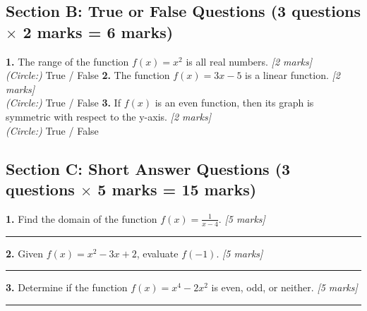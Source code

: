\documentclass[12pt,a4paper]{article}
\begin{document}
\subsection*{Section B: True or False Questions \normalfont\small (3 questions \(\times\) 2 marks = 6 marks)}
\vspace{4pt}
\noindent\textbf{1.} The range of the function $f(x) = x^2$ is all real numbers. \hfill\textit{[2 marks]}\\\noindent\quad\textit{(Circle:)} \quad True \quad / \quad False
\vspace{8pt}
\noindent\textbf{2.} The function $f(x) = 3x - 5$ is a linear function. \hfill\textit{[2 marks]}\\\noindent\quad\textit{(Circle:)} \quad True \quad / \quad False
\vspace{8pt}
\noindent\textbf{3.} If $f(x)$ is an even function, then its graph is symmetric with respect to the y-axis. \hfill\textit{[2 marks]}\\\noindent\quad\textit{(Circle:)} \quad True \quad / \quad False
\vspace{8pt}
\subsection*{Section C: Short Answer Questions \normalfont\small (3 questions \(\times\) 5 marks = 15 marks)}
\vspace{4pt}
\noindent\textbf{1.} Find the domain of the function $f(x) = \frac{1}{x-4}$. \hfill\textit{[5 marks]}
\vspace{22pt}
\noindent\rule{\linewidth}{0.2pt}
\vspace{4pt}
\noindent\textbf{2.} Given $f(x) = x^2 - 3x + 2$, evaluate $f(-1)$. \hfill\textit{[5 marks]}
\vspace{22pt}
\noindent\rule{\linewidth}{0.2pt}
\vspace{4pt}
\noindent\textbf{3.} Determine if the function $f(x) = x^4 - 2x^2$ is even, odd, or neither. \hfill\textit{[5 marks]}
\vspace{22pt}
\noindent\rule{\linewidth}{0.2pt}
\vspace{4pt}
\end{document}
